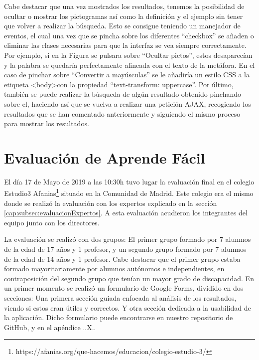 Cabe destacar que una vez mostrados los resultados, tenemos la posibilidad de ocultar o mostrar los pictogramas así como la definición y el ejemplo sin tener que volver a realizar la búsqueda. Esto se consigue teniendo un manejador de eventos, el cual una vez que se pincha sobre los diferentes ``checkbox'' se añaden o eliminar las clases necesarias para que la interfaz se vea siempre correctamente. Por ejemplo, si en la Figura se pulsara sobre ``Ocultar pictos'', estos desaparecían y la palabra se quedaría perfectamente alineada con el texto de la metáfora. En el caso de pinchar sobre ``Convertir a mayúsculas'' se le añadiría un estilo CSS a la etiqueta <body>con la propiedad ``text-transform: uppercase''.
Por último, también se puede realizar la búsqueda de algún resultado obtenido pinchando sobre el, haciendo así que se vuelva a realizar una petición AJAX, recogiendo los resultados que se han comentado anteriormente y siguiendo el mismo proceso para mostrar los resultados.

\section{Evaluación de Aprende Fácil}
\label{cap:sec:evaluacionApp}
El día 17 de Mayo de 2019 a las 10:30h tuvo lugar la evaluación final en el colegio Estudio3 Afanias\footnote{https://afanias.org/que-hacemos/educacion/colegio-estudio-3/} situado en la Comunidad de Madrid. Este colegio era el mismo donde se realizó la evaluación con los expertos explicado en la sección \ref{cap:subsec:evaluacionExpertos}. A esta evaluación acudieron los integrantes del equipo junto con los directores.

La evaluación se realizó con dos grupos: El primer grupo formado por 7 alumnos de la edad de 17 años y 1 profesor, y un segundo grupo formado por 7 alumnos de la edad de 14 años y 1 profesor.
Cabe destacar que el primer grupo estaba formado mayoritariamente por alumnos autónomos e independientes, en contraposición del segundo grupo que tenían un mayor grado de discapacidad.
En un primer momento se realizó un formulario de Google Forms, dividido en dos secciones: Una primera sección guiada enfocada al análisis de los resultados, viendo si estos eran útiles y correctos.  Y otra sección dedicada a la usabilidad de la aplicación.
Dicho formulario  puede encontrarse en nuestro repositorio de GitHub, y en el apéndice ..X..

